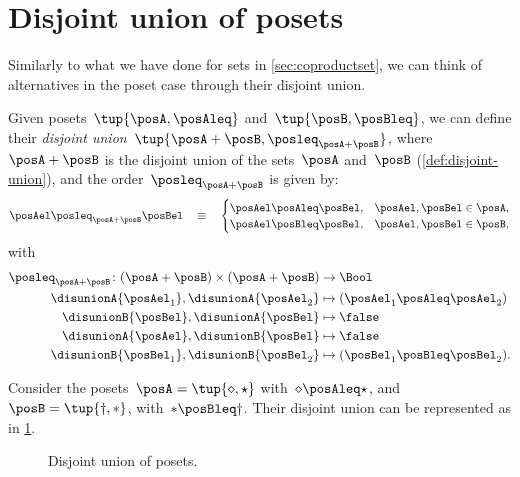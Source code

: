
\section{Disjoint union of posets}

Similarly to what we have done for sets in \cref{sec:coproductset}, we can think of alternatives in the poset case through their disjoint union.

\begin{definition}
  Given posets~$\tup{\posA, \posAleq}$ and~$\tup{\posB, \posBleq}$, we can define their \emph{disjoint union}~$\tup{\posA + \posB, \posleq_{\posA + \posB}}$, where~$\posA + \posB$
  is the disjoint union of the sets~$\posA$ and~$\posB$ (\cref{def:disjoint-union}), and the
  order~$\posleq_{\posA + \posB}$ is given by:
  \begin{equation}
    \posAel \posleq_{\posA + \posB} \posBel \quad\equiv\quad
    \begin{cases}
      \posAel \posAleq \posBel, & \posAel,\posBel \in \posA, \\
      \posAel \posBleq \posBel, & \posAel,\posBel \in \posB,
    \end{cases}
  \end{equation}
  with
  \begin{equation}
    \begin{aligned}
      \posleq_{\posA+\posB}\colon (\posA+\posB)\times (\posA+\posB)&\to \Bool\\
      \disunionA{\posAel_1},\disunionA{\posAel_2}&\mapsto (\posAel_1\posAleq \posAel_2)\\
      \disunionB{\posBel},\disunionA{\posBel}&\mapsto \false\\
      \disunionA{\posAel},\disunionB{\posBel}&\mapsto \false\\
      \disunionB{\posBel_1},\disunionB{\posBel_2}&\mapsto (\posBel_1\posBleq \posBel_2).
    \end{aligned}
  \end{equation}
\end{definition}


\begin{example}
  Consider the posets~$\posA=\tup{\diamond, \star}$ with~$\diamond \posAleq \star$, and~$\posB=\tup{\dagger,\ast}$, with~$\ast \posBleq \dagger$. Their disjoint union can be represented as in \cref{fig:poset-coproduct}.

  \begin{figure}[h!]
    \centering
    \caption{Disjoint union of posets.}
    \label{fig:poset-coproduct}
  \end{figure}
\end{example}